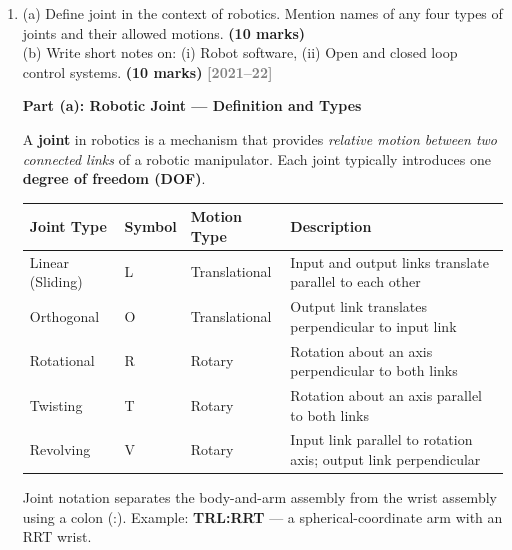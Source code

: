 \documentclass[12pt,a3paper]{article}
\newcommand{\yr}[1]{\hfill\textcolor{gray}{\small\textbf{[#1]}}}
\newcommand{\mk}[1]{\textcolor{orange!70!black}{\small\textbf{(#1 marks)}}}
\begin{document}
\begin{enumerate}
\item \label{qlabel:C1-Q2}
(a) Define joint in the context of robotics. Mention names of any four types of joints and their allowed motions. \mk{10}\\
(b) Write short notes on: (i) Robot software, (ii) Open and closed loop control systems. \mk{10}
\yr{2021--22}

\begin{tcolorbox}[enhanced,breakable,ansbox,colback=cA!4,colframe=cA,
  boxrule=0.8pt,arc=5pt,
  title={\textbf{Answer}},fonttitle=\bfseries\color{white},colbacktitle=cA]

\textbf{Part (a): Robotic Joint — Definition and Types}

A \textbf{joint} in robotics is a mechanism that provides \emph{relative motion
between two connected links} of a robotic manipulator. Each joint typically
introduces one \textbf{degree of freedom (DOF)}.

\begin{center}
\small
\begin{tabular}{@{}lllp{4.5cm}@{}}
\toprule
\textbf{Joint Type} & \textbf{Symbol} & \textbf{Motion Type} & \textbf{Description} \\
\midrule
Linear (Sliding)    & L & Translational & Input and output links translate
                                          parallel to each other \\
Orthogonal          & O & Translational & Output link translates perpendicular
                                          to input link \\
Rotational          & R & Rotary        & Rotation about an axis perpendicular
                                          to both links \\
Twisting            & T & Rotary        & Rotation about an axis parallel to
                                          both links \\
Revolving           & V & Rotary        & Input link parallel to rotation axis;
                                          output link perpendicular \\
\bottomrule
\end{tabular}
\end{center}

Joint notation separates the body-and-arm assembly from the wrist assembly
using a colon (:). Example: \textbf{TRL:RRT} — a spherical-coordinate arm with
an RRT wrist.

\hrulefill


\end{tcolorbox}
\end{enumerate}
\end{document}
